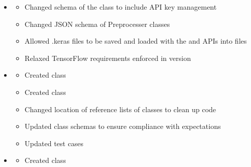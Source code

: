 \documentclass[letterpaper,10pt,english]{sphinxmanual}
\begin{document}
\begin{itemize}
\begin{description}
\begin{itemize}
\end{itemize}

\end{description}

\item {} \begin{description}
\begin{itemize}
\item {} 
\sphinxAtStartPar
Changed schema of the  class to include API key management

\item {} 
\sphinxAtStartPar
Changed JSON schema of Preprocesser classes

\item {} 
\sphinxAtStartPar
Allowed .keras files to be saved and loaded with the  and  APIs into  files

\item {} 
\sphinxAtStartPar
Relaxed TensorFlow requirements enforced in version 

\end{itemize}

\end{description}

\item {} \begin{description}
\begin{itemize}
\item {} 
\sphinxAtStartPar
Created  class

\item {} 
\sphinxAtStartPar
Created  class

\item {} 
\sphinxAtStartPar
Changed location of reference lists of classes to clean up code

\item {} 
\sphinxAtStartPar
Updated class schemas to ensure compliance with expectations

\item {} 
\sphinxAtStartPar
Updated test cases

\end{itemize}

\end{description}

\item {} \begin{description}
\begin{itemize}
\item {} 
\sphinxAtStartPar
Created  class


\end{itemize}
\end{description}
\end{itemize}
\end{document}
